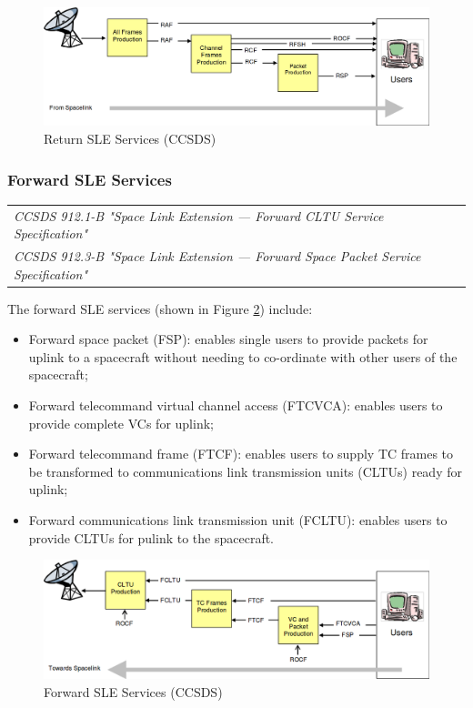 \begin{figure}[h]
\centering\includegraphics[scale=0.3]{fig/return_sle_services}
\caption{Return SLE Services (CCSDS)}
\label{fig:Return SLE Services}
\end{figure}

\subsubsection{Forward SLE Services}

\begin{tabular}{l}
\textit{CCSDS 912.1-B "Space Link Extension — Forward CLTU Service Specification" \cite{CCSDS-912.1-B}} \\
\textit{CCSDS 912.3-B "Space Link Extension — Forward Space Packet Service Specification" \cite{CCSDS-912.3-B}} \\
\end{tabular}

The forward SLE services (shown in Figure \ref{fig:Forward SLE Services}) include: 

\begin{itemize}
\item Forward space packet (FSP): enables single users to provide packets for uplink to a spacecraft without needing to co-ordinate with other users of the spacecraft;
\item Forward telecommand virtual channel access (FTCVCA): enables users to provide complete VCs for uplink;
\item Forward telecommand frame (FTCF): enables users to supply TC frames to be transformed to communications link transmission units (CLTUs) ready for uplink;
\item Forward communications link transmission unit (FCLTU): enables users to provide CLTUs for pulink to the spacecraft.
\end{itemize}

\begin{figure}[h]
\centering\includegraphics[scale=0.4]{fig/forward_sle_services}
\caption{Forward SLE Services (CCSDS)}
\label{fig:Forward SLE Services}
\end{figure}

